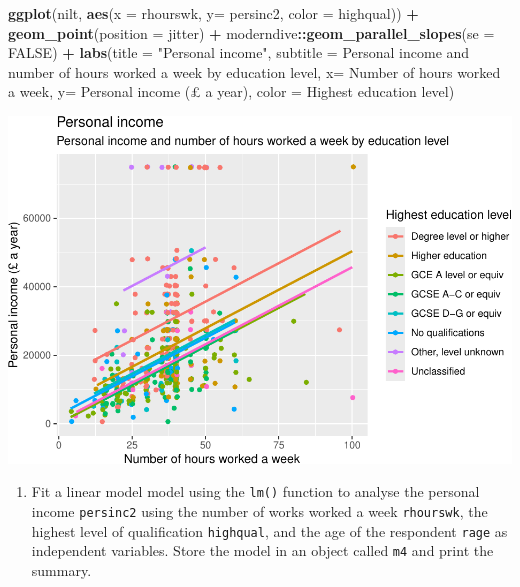 \documentclass[
]{book}
\newenvironment{Shaded}{\begin{snugshade}}{\end{snugshade}}
\newcommand{\AttributeTok}[1]{\textcolor[rgb]{0.13,0.29,0.53}{#1}}
\newcommand{\ConstantTok}[1]{\textcolor[rgb]{0.56,0.35,0.01}{#1}}
\newcommand{\FunctionTok}[1]{\textcolor[rgb]{0.13,0.29,0.53}{\textbf{#1}}}
\newcommand{\NormalTok}[1]{#1}
\newcommand{\SpecialCharTok}[1]{\textcolor[rgb]{0.81,0.36,0.00}{\textbf{#1}}}
\newcommand{\StringTok}[1]{\textcolor[rgb]{0.31,0.60,0.02}{#1}}
\providecommand{\tightlist}{%
  \setlength{\itemsep}{0pt}\setlength{\parskip}{0pt}}
\begin{document}
\begin{Shaded}
\begin{Highlighting}[]
\FunctionTok{ggplot}\NormalTok{(nilt, }\FunctionTok{aes}\NormalTok{(}\AttributeTok{x =}\NormalTok{ rhourswk, }\AttributeTok{y=}\NormalTok{ persinc2, }\AttributeTok{color =}\NormalTok{ highqual)) }\SpecialCharTok{+}
  \FunctionTok{geom\_point}\NormalTok{(}\AttributeTok{position =} \StringTok{\textquotesingle{}jitter\textquotesingle{}}\NormalTok{) }\SpecialCharTok{+}
\NormalTok{  moderndive}\SpecialCharTok{::}\FunctionTok{geom\_parallel\_slopes}\NormalTok{(}\AttributeTok{se =} \ConstantTok{FALSE}\NormalTok{) }\SpecialCharTok{+}
  \FunctionTok{labs}\NormalTok{(}\AttributeTok{title =} \StringTok{"Personal income"}\NormalTok{,}
       \AttributeTok{subtitle =} \StringTok{\textquotesingle{}Personal income and number of hours worked a week by education level\textquotesingle{}}\NormalTok{,}
       \AttributeTok{x=} \StringTok{\textquotesingle{}Number of hours worked a week\textquotesingle{}}\NormalTok{, }\AttributeTok{y=} \StringTok{\textquotesingle{}Personal income (£ a year)\textquotesingle{}}\NormalTok{, }
       \AttributeTok{color =} \StringTok{\textquotesingle{}Highest education level\textquotesingle{}}\NormalTok{)}
\end{Highlighting}
\end{Shaded}

\begin{flushleft}\includegraphics[width=1\linewidth]{lab-workbook_files/figure-latex/unnamed-chunk-144-1} \end{flushleft}

\begin{enumerate}
\def\labelenumi{\arabic{enumi}.}
\setcounter{enumi}{3}
\tightlist
\item
  Fit a linear model model using the \texttt{lm()} function to analyse the personal income \texttt{persinc2} using the number of works worked a week \texttt{rhourswk}, the highest level of qualification \texttt{highqual}, and the age of the respondent \texttt{rage} as independent variables. Store the model in an object called \texttt{m4} and print the summary.
\end{enumerate}
\end{document}
